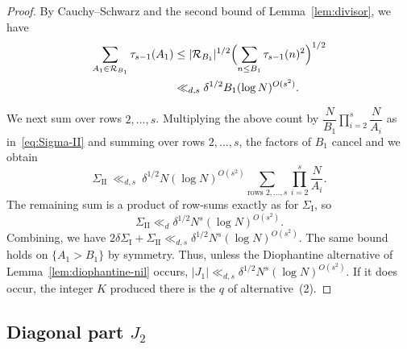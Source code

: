 \begin{proof}
By Cauchy--Schwarz and the second bound of Lemma~\ref{lem:divisor}, we have
\begin{align*}
\sum_{A_1\in\mathcal{R}_{B_1}}\tau_{s-1}(A_1)
&\leq |\mathcal{R}_{B_1}|^{1/2}\Bigl(\sum_{n\leq B_1}\tau_{s-1}(n)^2\Bigr)^{1/2}\\
&\ll_{d,s}\delta^{1/2}B_1(\log N)^{O(s^2)}.
\end{align*}

We next sum over rows $2,\dots, s$.
Multiplying the above count by $\dfrac{N}{B_1}\prod_{i=2}^s\dfrac{N}{A_i}$ as in~\eqref{eq:Sigma-II} and summing over rows $2,\ldots,s$,
the factors of $B_1$ cancel and we obtain
\[
\Sigma_{\mathrm{II}}\ \ll_{d,s}\ \delta^{1/2}N(\log N)^{O(s^2)}\sum_{\text{rows }2,\ldots,s}\prod_{i=2}^s\frac{N}{A_i}.
\]
The remaining sum is a product of row-sums exactly as for $\Sigma_{\mathrm I}$, so
\[
\Sigma_{\mathrm{II}}\ll_d \delta^{1/2} N^s(\log N)^{O(s^2)}.
\]
Combining, we have $2\delta\Sigma_{\mathrm I}+\Sigma_{\mathrm{II}}\ll_{d,s}\delta^{1/2} N^s(\log N)^{O(s^2)}$. The same bound holds on $\{A_1>B_1\}$ by symmetry.
Thus, unless the Diophantine alternative of Lemma~\ref{lem:diophantine-nil} occurs, $|J_1|\ll_{d,s} \delta^{1/2} N^s(\log N)^{O(s^2)}$.
If it does occur, the integer $K$ produced there is the $q$ of alternative~(2).
\end{proof}

\subsection{\texorpdfstring{Diagonal part $J_2$}{Diagonal part J_2}}
\label{sec:diagonal}


